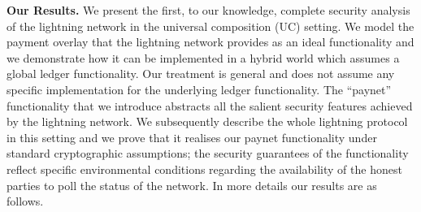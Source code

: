 \noindent \textbf{Our Results.} We present the first, to our knowledge, complete
security analysis of the lightning network in the
universal composition (UC) setting. We model the payment overlay that the
lightning network provides as an ideal functionality and we demonstrate how it
can be implemented in a hybrid world which assumes a global ledger
functionality. Our treatment is general and does not assume any specific
implementation for the underlying ledger functionality. The ``paynet''
functionality that we introduce abstracts all the salient security features
achieved by the lightning network. We subsequently describe the whole lightning
protocol in this setting and we prove that it realises our paynet functionality
under standard cryptographic assumptions; the security guarantees of the
functionality reflect specific environmental conditions regarding the
availability of the honest parties to poll the status of the network. In more
details our results are as follows.

